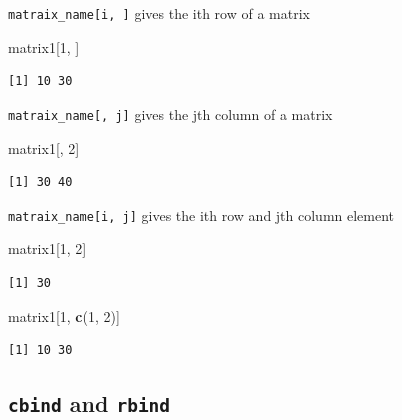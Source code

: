 \documentclass[
]{book}
\newenvironment{Shaded}{\begin{snugshade}}{\end{snugshade}}
\newcommand{\DecValTok}[1]{\textcolor[rgb]{0.00,0.00,0.81}{#1}}
\newcommand{\KeywordTok}[1]{\textcolor[rgb]{0.13,0.29,0.53}{\textbf{#1}}}
\newcommand{\NormalTok}[1]{#1}
\begin{document}
\texttt{matraix\_name{[}i,\ {]}} gives the ith row of a matrix

\begin{Shaded}
\begin{Highlighting}[]
\NormalTok{matrix1[}\DecValTok{1}\NormalTok{, ]}
\end{Highlighting}
\end{Shaded}

\begin{verbatim}
[1] 10 30
\end{verbatim}

\texttt{matraix\_name{[},\ j{]}} gives the jth column of a matrix

\begin{Shaded}
\begin{Highlighting}[]
\NormalTok{matrix1[, }\DecValTok{2}\NormalTok{]}
\end{Highlighting}
\end{Shaded}

\begin{verbatim}
[1] 30 40
\end{verbatim}

\texttt{matraix\_name{[}i,\ j{]}} gives the ith row and jth column element

\begin{Shaded}
\begin{Highlighting}[]
\NormalTok{matrix1[}\DecValTok{1}\NormalTok{, }\DecValTok{2}\NormalTok{]}
\end{Highlighting}
\end{Shaded}

\begin{verbatim}
[1] 30
\end{verbatim}

\begin{Shaded}
\begin{Highlighting}[]
\NormalTok{matrix1[}\DecValTok{1}\NormalTok{, }\KeywordTok{c}\NormalTok{(}\DecValTok{1}\NormalTok{, }\DecValTok{2}\NormalTok{)] }
\end{Highlighting}
\end{Shaded}

\begin{verbatim}
[1] 10 30
\end{verbatim}

\hypertarget{cbind-and-rbind}{%
\subsection{\texorpdfstring{\texttt{cbind} and \texttt{rbind}}{cbind and rbind}}\label{cbind-and-rbind}}
\end{document}

